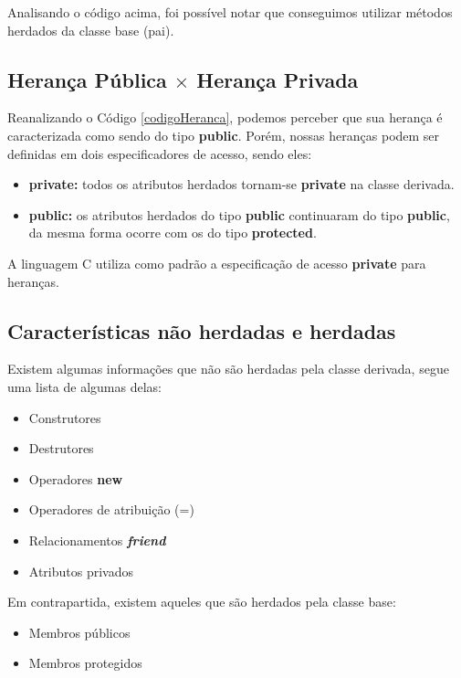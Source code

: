 \documentclass[a4paper, 12pt]{article}
\def\Cplusplus{C\raisebox{0.5ex}{\tiny\textbf{++}} }
\begin{document}
		Analisando o código acima, foi possível notar que conseguimos utilizar métodos herdados da classe base (pai).
		
		\subsection{Herança Pública $\times$ Herança Privada}
		
		Reanalizando o Código \ref{codigoHeranca}, podemos perceber que sua herança é caracterizada como sendo do tipo \textbf{public}. Porém, nossas heranças podem ser definidas em dois especificadores de acesso, sendo eles:
		
		\begin{itemize}
			\item \textbf{private:} todos os atributos herdados tornam-se \textbf{private} na classe derivada.
			
			\item \textbf{public:} os atributos herdados do tipo \textbf{public} continuaram do tipo \textbf{public}, da mesma forma ocorre com os do tipo \textbf{protected}.
		\end{itemize}
	
		A linguagem \Cplusplus utiliza como padrão a especificação de acesso \textbf{private} para heranças.
		
		
		\subsection{Características não herdadas e herdadas}
		
		Existem algumas informações que não são herdadas pela classe derivada, segue uma lista de algumas delas:
		
		\begin{itemize}
			\item Construtores
			\item Destrutores
			\item Operadores \textbf{new}
			\item Operadores de atribuição (=)
			\item Relacionamentos \textbf{\textit{friend}}
			\item Atributos privados
		\end{itemize}
	
		Em contrapartida, existem aqueles que são herdados pela classe base:
		
		\begin{itemize}
			\item Membros públicos
			\item Membros protegidos 
		\end{itemize}
	
\end{document}
